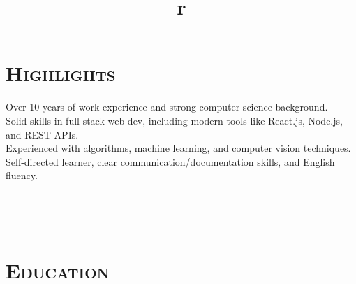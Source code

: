 \begin{resume}

\vspace{-0.2in}


\section{\textsc{Highlights}}




Over 10 years of work experience and strong computer science background.\vspace{0.4em}\\
Solid skills in full stack web dev, including modern tools like React.js, Node.js, and REST APIs.\vspace{0.4em}\\
Experienced with algorithms, machine learning, and computer vision techniques.\vspace{0.4em}\\
Self-directed learner, clear communication/documentation skills, and English fluency.


\begin{formatb}
  \\
  \title{r}\\
\end{formatb}

\section{\textsc{Education}}


\end{resume}
